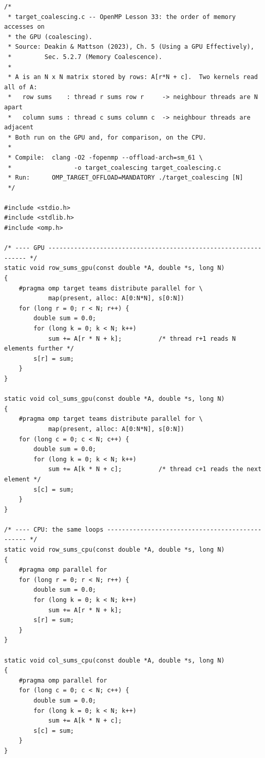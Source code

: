 \documentclass[11pt,a4paper]{article}
\let\origtexttt\texttt
\renewcommand{\texttt}[1]{\textcolor{black!60}{\origtexttt{#1}}}
\begin{document}
\begin{lstlisting}[caption={\textbf{\origtexttt{target\_coalescing.c}} -- row and column sums of a matrix stored by rows, on the GPU and on the CPU.}, label={lst:coal}]
/*
 * target_coalescing.c -- OpenMP Lesson 33: the order of memory accesses on
 * the GPU (coalescing).
 * Source: Deakin & Mattson (2023), Ch. 5 (Using a GPU Effectively),
 *         Sec. 5.2.7 (Memory Coalescence).
 *
 * A is an N x N matrix stored by rows: A[r*N + c].  Two kernels read all of A:
 *   row sums    : thread r sums row r     -> neighbour threads are N apart
 *   column sums : thread c sums column c  -> neighbour threads are adjacent
 * Both run on the GPU and, for comparison, on the CPU.
 *
 * Compile:  clang -O2 -fopenmp --offload-arch=sm_61 \
 *                 -o target_coalescing target_coalescing.c
 * Run:      OMP_TARGET_OFFLOAD=MANDATORY ./target_coalescing [N]
 */

#include <stdio.h>
#include <stdlib.h>
#include <omp.h>

/* ---- GPU ---------------------------------------------------------------- */
static void row_sums_gpu(const double *A, double *s, long N)
{
    #pragma omp target teams distribute parallel for \
            map(present, alloc: A[0:N*N], s[0:N])
    for (long r = 0; r < N; r++) {
        double sum = 0.0;
        for (long k = 0; k < N; k++)
            sum += A[r * N + k];          /* thread r+1 reads N elements further */
        s[r] = sum;
    }
}

static void col_sums_gpu(const double *A, double *s, long N)
{
    #pragma omp target teams distribute parallel for \
            map(present, alloc: A[0:N*N], s[0:N])
    for (long c = 0; c < N; c++) {
        double sum = 0.0;
        for (long k = 0; k < N; k++)
            sum += A[k * N + c];          /* thread c+1 reads the next element */
        s[c] = sum;
    }
}

/* ---- CPU: the same loops ------------------------------------------------ */
static void row_sums_cpu(const double *A, double *s, long N)
{
    #pragma omp parallel for
    for (long r = 0; r < N; r++) {
        double sum = 0.0;
        for (long k = 0; k < N; k++)
            sum += A[r * N + k];
        s[r] = sum;
    }
}

static void col_sums_cpu(const double *A, double *s, long N)
{
    #pragma omp parallel for
    for (long c = 0; c < N; c++) {
        double sum = 0.0;
        for (long k = 0; k < N; k++)
            sum += A[k * N + c];
        s[c] = sum;
    }
}


\end{lstlisting}
\end{document}
